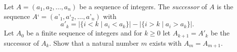 Let $A=(a_1,a_2,\ldots,a_n)$ be a sequence of integers. The \emph{successor} of $A$ is
the sequence $A‘=(a’_1,a‘_2,\ldots,a’_n)$ with 
$$a'_k = |\{i<k \mid a_i<a_k\}|-|\{i>k \mid a_i>a_k\}|.$$
Let $A_0$ be a finite sequence of integers and for $k \geq 0$ let $A_{k+1}=A'_k$ be
the successor of $A_k$. Show that a natural number $m$ exists with $A_m=A_{m+1}$.
